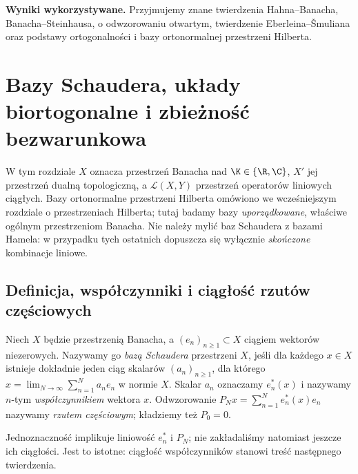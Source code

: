 \setcounter{section}{26}
\noindent\textbf{Wyniki wykorzystywane.}
Przyjmujemy znane twierdzenia Hahna--Banacha,
Banacha--Steinhausa, o odwzorowaniu otwartym,
twierdzenie Eberleina--\v Smuliana oraz podstawy
ortogonalności i bazy ortonormalnej przestrzeni Hilberta.
\par\medskip
\section{Bazy Schaudera, układy biortogonalne i zbieżność bezwarunkowa}
\label{sec:bazy27}

W tym rozdziale $X$ oznacza przestrzeń Banacha nad $\K\in\{\R,\C\}$,
$X'$ jej przestrzeń dualną topologiczną, a $\mathcal L(X,Y)$
przestrzeń operatorów liniowych ciągłych. Bazy ortonormalne przestrzeni
Hilberta omówiono we wcześniejszym rozdziale o przestrzeniach Hilberta; tutaj badamy bazy
\emph{uporządkowane}, właściwe ogólnym przestrzeniom Banacha.
Nie należy mylić baz Schaudera z bazami Hamela: w przypadku tych
ostatnich dopuszcza się wyłącznie \emph{skończone} kombinacje liniowe.

\subsection{Definicja, współczynniki i ciągłość rzutów częściowych}

\begin{definicja}
\label{def:schauder27}
Niech $X$ będzie przestrzenią Banacha, a $(e_n)_{n\ge1}\subset X$
ciągiem wektorów niezerowych. Nazywamy go \emph{bazą Schaudera}
przestrzeni $X$, jeśli dla każdego $x\in X$ istnieje dokładnie jeden
ciąg skalarów $(a_n)_{n\ge1}$, dla którego
$x=\lim_{N\to\infty}\sum_{n=1}^N a_ne_n$ w normie $X$.
Skalar $a_n$ oznaczamy $e_n^*(x)$ i nazywamy $n$-tym
\emph{współczynnikiem} wektora $x$. Odwzorowanie
$P_Nx=\sum_{n=1}^Ne_n^*(x)e_n$ nazywamy
\emph{rzutem częściowym}; kładziemy też $P_0=0$.
\end{definicja}

Jednoznaczność implikuje liniowość $e_n^*$ i $P_N$; nie zakładaliśmy
natomiast jeszcze ich ciągłości. Jest to istotne: ciągłość
współczynników stanowi treść następnego twierdzenia.

